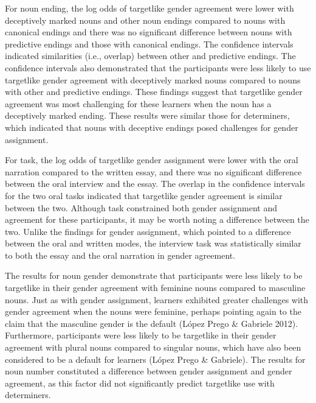 \documentclass[12pt]{article}
\newenvironment{styleNoSpacing}{\setlength\leftskip{0cm}\setlength\rightskip{0cm plus 1fil}\setlength\parindent{0cm}\setlength\parfillskip{0pt plus 1fil}\setlength\parskip{0cm plus 1pt}\writerlistparindent\writerlistleftskip\leavevmode\normalfont\normalsize\fontsize{11pt}{13.2pt}\selectfont\writerlistlabel\ignorespaces}{\unskip\vspace{0cm plus 1pt}\par}
\newcommand\writerlistleftskip{}
\newcommand\writerlistparindent{}
\newcommand\writerlistlabel{}
\begin{document}
\begin{styleNoSpacing}
For noun ending, the log odds of targetlike gender agreement were lower with deceptively marked nouns and other noun endings compared to nouns with canonical endings and there was no significant difference between nouns with predictive endings and those with canonical endings. The confidence intervals indicated similarities (i.e., overlap) between other and predictive endings. The confidence intervals also demonstrated that the participants were less likely to use targetlike gender agreement with deceptively marked nouns compared to nouns with other and predictive endings. These findings suggest that targetlike gender agreement was most challenging for these learners when the noun has a deceptively marked ending. These results were similar those for determiners, which indicated that nouns with deceptive endings posed challenges for gender assignment.
\end{styleNoSpacing}

\begin{styleNoSpacing}
For task, the log odds of targetlike gender assignment were lower with the oral narration compared to the written essay, and there was no significant difference between the oral interview and the essay. The overlap in the confidence intervals for the two oral tasks indicated that targetlike gender agreement is similar between the two. Although task constrained both gender assignment and agreement for these participants, it may be worth noting a difference between the two. Unlike the findings for gender assignment, which pointed to a difference between the oral and written modes, the interview task was statistically similar to both the essay and the oral narration in gender agreement. 
\end{styleNoSpacing}

\begin{styleNoSpacing}
The results for noun gender demonstrate that participants were less likely to be targetlike in their gender agreement with feminine nouns compared to masculine nouns. Just as with gender assignment, learners exhibited greater challenges with gender agreement when the nouns were feminine, perhaps pointing again to the claim that the masculine gender is the default (López Prego \& Gabriele 2012). Furthermore, participants were less likely to be targetlike in their gender agreement with plural nouns compared to singular nouns, which have also been considered to be a default for learners (López Prego \& Gabriele). The results for noun number constituted a difference between gender assignment and gender agreement, as this factor did not significantly predict targetlike use with determiners.
\end{styleNoSpacing}
\end{document}
